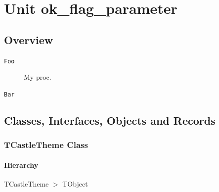 \documentclass{report}
\newif\ifpdf
\begin{document}
\label{toc}\tableofcontents
\newpage
\newlength{\tmplength}
\chapter{Unit ok{\_}flag{\_}parameter}
\label{ok_flag_parameter}
\section{Overview}
\begin{description}
\item[\texttt{\begin{ttfamily}TCastleTheme\end{ttfamily} Class}]
\end{description}
\begin{description}
\item[\texttt{Foo}]My proc.
\item[\texttt{Bar}]
\end{description}
\section{Classes, Interfaces, Objects and Records}
\ifpdf
\subsection*{\large{\textbf{TCastleTheme Class}}\normalsize\hspace{1ex}\hrulefill}
\else
\subsection*{TCastleTheme Class}
\fi
\label{ok_flag_parameter.TCastleTheme}
\subsubsection*{\large{\textbf{Hierarchy}}\normalsize\hspace{1ex}\hfill}
TCastleTheme {$>$} TObject
\end{document}
